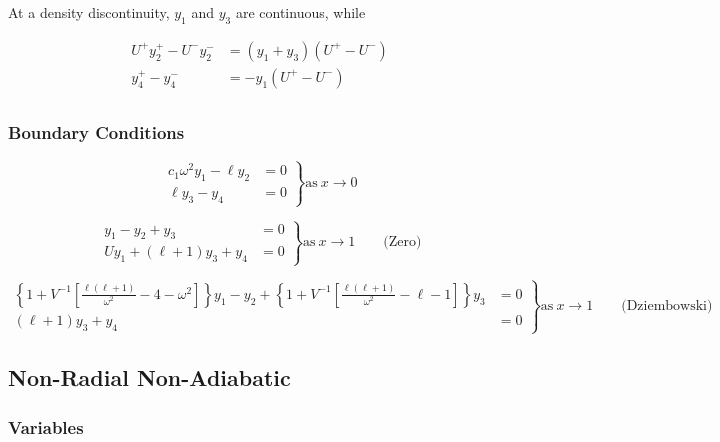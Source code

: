 \documentclass[fleqn]{article}
\begin{document}
At a density discontinuity, $y_{1}$ and $y_{3}$ are continuous, while

\begin{align*}
U^{+} y_{2}^{+} - U^{-} y_{2}^{-} &= (y_{1} + y_{3}) (U^{+} - U^{-}) \\
y_{4}^{+} - y_{4}^{-} &= -y_{1} (U^{+} - U^{-}) \\
\end{align*}

\subsubsection*{Boundary Conditions}

\begin{equation*}
\left.
\begin{aligned}
c_{1} \omega^{2} y_{1} - \ell y_{2} &= 0 \\
\ell y_{3} - y_{4} &= 0
\end{aligned}
\right\}
\text{as}\ x \rightarrow 0
\end{equation*}

\begin{equation*}
\left.
\begin{aligned}
y_{1} - y_{2} + y_{3} &= 0 \\
U y_{1} + (\ell + 1) y_{3} + y_{4} &= 0
\end{aligned}
\right\}
\text{as}\ x \rightarrow 1 \qquad \text{(Zero)}
\end{equation*}

\begin{equation*}
\left.
\begin{aligned}
\left\{ 1 + V^{-1} \left[ \frac{\ell(\ell+1)}{\omega^{2}} - 4 - \omega^{2} \right] \right\} y_{1} -
y_{2} +
\left\{ 1 + V^{-1} \left[ \frac{\ell(\ell+1)}{\omega^{2}} - \ell - 1 \right] \right\} y_{3} &= 0 \\
(\ell + 1) y_{3} + y_{4} &= 0
\end{aligned}
\right\} 
\text{as}\ x \rightarrow 1 \qquad \text{(Dziembowski)}
\end{equation*}


\newpage

\subsection*{Non-Radial Non-Adiabatic}

\subsubsection*{Variables}
\end{document}
